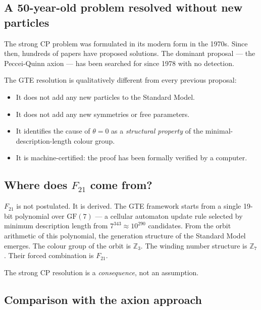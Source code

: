 \documentclass[11pt,a4paper]{article}
\begin{document}
\subsection{A 50-year-old problem resolved without new particles}

The strong CP problem was formulated in its modern form in the 1970s.  Since then, hundreds of papers have proposed solutions.  The dominant proposal --- the Peccei-Quinn axion --- has been searched for since 1978 with no detection.

The GTE resolution is qualitatively different from every previous proposal:
\begin{itemize}
  \item It does not add any new particles to the Standard Model.
  \item It does not add any new symmetries or free parameters.
  \item It identifies the cause of $\theta = 0$ as a \emph{structural property} of the minimal-description-length colour group.
  \item It is machine-certified: the proof has been formally verified by a computer.
\end{itemize}

\subsection{Where does $F_{21}$ come from?}

$F_{21}$ is not postulated.  It is derived.  The GTE framework starts from a single 19-bit polynomial over $\mathrm{GF}(7)$ --- a cellular automaton update rule selected by minimum description length from $7^{343} \approx 10^{290}$ candidates.  From the orbit arithmetic of this polynomial, the generation structure of the Standard Model emerges.  The colour group of the orbit is $\mathbb{Z}_3$.  The winding number structure is $\mathbb{Z}_7$.  Their forced combination is $F_{21}$.

The strong CP resolution is a \emph{consequence}, not an assumption.

\subsection{Comparison with the axion approach}
\end{document}
